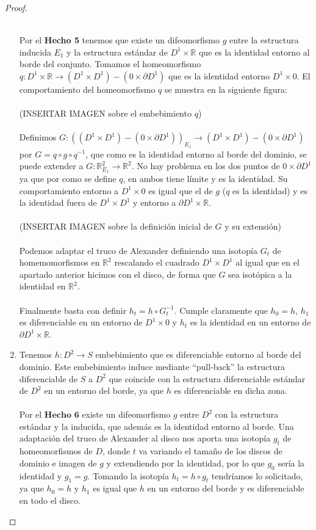 \begin{proof}
\begin{enumerate}
			\\ Por el \textbf{Hecho 5} tenemos que existe un difeomorfismo $g$ entre la estructura inducida $E_1$ y la estructura estándar de $D^1\times \mathbb{R}$ que es la identidad entorno al borde del conjunto. Tomamos el homeomorfismo $q: D^1\times \mathbb{R} \rightarrow (D^1\times D^1) - (0 \times \partial D^1)$ que es la identidad entorno $D^1\times 0$. El comportamiento del homeomorfismo $q$ se muestra en la siguiente figura:\\
			\\ (INSERTAR IMAGEN sobre el embebimiento $q$)\\
			\\ Definimos $G:  ((D^1\times D^1) - (0 \times \partial D^1))_{E_1} \rightarrow (D^1\times D^1) - (0 \times \partial D^1)$ por $G = q \circ g \circ q^{-1}$, que como es la identidad entorno al borde del dominio, se puede extender a $G:\mathbb{R}^2_{E_1} \rightarrow \mathbb{R}^2$. No hay problema en los dos puntos de $0 \times \partial D^1$ ya que por como se define $q$, en ambos tiene límite y es la identidad. Su comportamiento entorno a $D^1 \times 0$ es igual que el de $g$ ($q$ es la identidad) y es la identidad fuera de $D^1 \times D^1$ y entorno a $\partial D^1 \times \mathbb{R}$.\\
			\\ (INSERTAR IMAGEN sobre la definición inicial de $G$ y su extensión)\\
			\\Podemos adaptar el truco de Alexander definiendo una isotopía $G_t$ de homemomorfismos en $\mathbb{R}^2$ rescalando el cuadrado $D^1 \times D^1$ al igual que en el apartado anterior hicimos con el disco, de forma que $G$ sea isotópica a la identidad en $\mathbb{R}^2$.\\
			\\ Finalmente basta con definir $h_t = h \circ G_t^{-1}$. Cumple claramente que $h_0 = h$, $h_1$ es diferenciable en un entorno de $D^1 \times 0$ y $h_t$ es la identidad en un entorno de $\partial D^1 \times \mathbb{R}$.
		\item Tenemos $h: D^2 \rightarrow S$ embebimiento que es diferenciable entorno al borde del dominio. Este embebimiento induce mediante ``pull-back'' la estructura diferenciable de $S$ a $D^2$ que coincide con la estructura diferenciable estándar de $D^2$ en un entorno del borde, ya que $h$ es diferenciable en dicha zona.\\
			\\ Por el $\textbf{Hecho 6}$ existe un difeomorfismo $g$ entre $D^2$ con la estructura estándar y la inducida, que además es la identidad entorno al borde. Una adaptación del truco de Alexander al disco nos aporta una isotopía $g_t$ de homeomorfismos de $D$, donde $t$ va variando el tamaño de los discos de dominio e imagen de $g$ y extendiendo por la identidad, por lo que $g_0$ sería la identidad y $g_1 = g$. Tomando la isotopía $h_t = h \circ g_t$ tendríamos lo solicitado, ya que $h_0 = h$ y $h_1$ es igual que $h$ en un entorno del borde y es diferenciable en todo el disco.
	\end{enumerate}
	
\end{proof}


